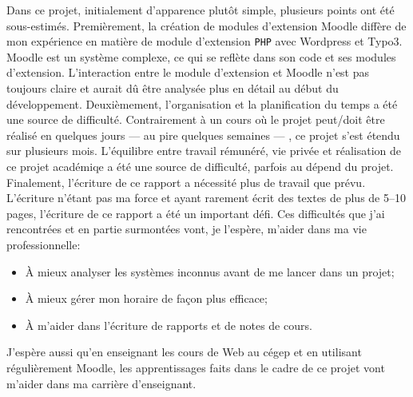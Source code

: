 \begin{conclusion}
Dans ce projet, initialement d'apparence plut\^ot simple, plusieurs points ont \'et\'e sous-estim\'es.
Premi\`erement, la cr\'eation de modules d'extension Moodle diff\`ere de mon exp\'erience en mati\`ere de module d'extension \texttt{PHP} avec Wordpress et Typo3.
Moodle est un syst\`eme complexe, ce qui se refl\`ete dans son code et ses modules d'extension.
L'interaction entre le module d'extension et Moodle n'est pas toujours claire et aurait d\^u \^etre analys\'ee plus en d\'etail au d\'ebut du d\'eveloppement.
Deuxi\`emement, l'organisation et la planification du temps a \'et\'e une source de difficult\'e.
Contrairement \`a un cours o\`u le projet peut/doit \^etre r\'ealis\'e en quelques jours --- au pire quelques semaines --- , ce projet s'est \'etendu sur plusieurs mois.
L'\'equilibre entre travail r\'emun\'er\'e,  vie priv\'ee et r\'ealisation de ce projet acad\'emiqe a \'et\'e une source de difficult\'e, parfois au d\'epend du projet.
Finalement, l'\'ecriture de ce rapport a n\'ecessit\'e plus de travail que pr\'evu.
L'\'ecriture n'\'etant pas ma force et ayant rarement \'ecrit des textes de plus de 5--10 pages, l'\'ecriture de ce rapport a \'et\'e un important d\'efi.
Ces difficult\'es que j'ai rencontr\'ees et en partie surmont\'ees vont, je l'esp\`ere, m'aider dans ma vie professionnelle:
\begin{itemize}
  \item \`A mieux analyser les syst\`emes inconnus avant de me lancer dans un projet;
  \item \`A mieux g\'erer mon horaire de fa\c{c}on plus efficace;
  \item \`A m'aider dans l'\'ecriture de rapports et de notes de cours.
\end{itemize}
J'esp\`ere aussi qu'en enseignant les cours de Web au c\'egep et en utilisant r\'eguli\`erement Moodle, les apprentissages faits dans le cadre de ce projet vont m'aider dans ma carri\`ere d'enseignant.
\end{conclusion}
